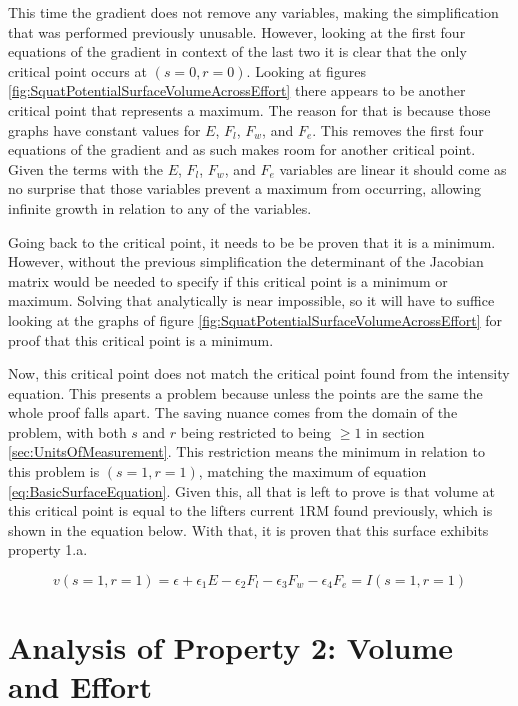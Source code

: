 This time the gradient does not remove any variables, making the simplification that was performed previously unusable. However, looking at the first four equations of the gradient in context of the last two it is clear that the only critical point occurs at $(s=0,r=0)$. Looking at figures \ref{fig:SquatPotentialSurfaceVolumeAcrossEffort} there appears to be another critical point that represents a maximum. The reason for that is because those graphs have constant values for $E$, $F_l$, $F_w$, and $F_e$. This removes the first four equations of the gradient and as such makes room for another critical point. Given the terms with the $E$, $F_l$, $F_w$, and $F_e$ variables are linear it should come as no surprise that those variables prevent a maximum from occurring, allowing infinite growth in relation to any of the variables.

Going back to the critical point, it needs to be be proven that it is a minimum. However, without the previous simplification the determinant of the Jacobian matrix would be needed to specify if this critical point is a minimum or maximum. Solving that analytically is near impossible, so it will have to suffice looking at the graphs of figure \ref{fig:SquatPotentialSurfaceVolumeAcrossEffort} for proof that this critical point is a minimum. 

Now, this critical point does not match the critical point found from the intensity equation. This presents a problem because unless the points are the same the whole proof falls apart. The saving nuance comes from the domain of the problem, with both $s$ and $r$ being restricted to being $\ge 1$ in section \ref{sec:UnitsOfMeasurement}. This restriction means the minimum in relation to this problem is $(s=1,r=1)$, matching the maximum of equation \ref{eq:BasicSurfaceEquation}. Given this, all that is left to prove is that volume at this critical point is equal to the lifters current 1RM found previously, which is shown in the equation below. With that, it is proven that this surface exhibits property 1.a.

\begin{equation}
	v(s=1,r=1)=
    			\epsilon+
    			\epsilon_1 E-
    			\epsilon_2 F_l-
    			\epsilon_3 F_w-
    			\epsilon_4 F_e = I(s=1,r=1)
\end{equation}


\section{Analysis of Property 2: Volume and Effort}
\label{sec:PotentialSurfaceAnalysisOfProperty2}

